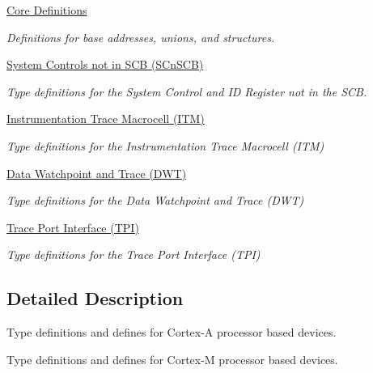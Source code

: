 \begin{DoxyCompactItemize}
\hyperlink{group___c_m_s_i_s__core__base}{Core Definitions}
\begin{DoxyCompactList}\small\item\em Definitions for base addresses, unions, and structures. \end{DoxyCompactList}\item 
\hyperlink{group___c_m_s_i_s___s_cn_s_c_b}{System Controls not in S\+C\+B (\+S\+Cn\+S\+C\+B)}
\begin{DoxyCompactList}\small\item\em Type definitions for the System Control and ID Register not in the S\+CB. \end{DoxyCompactList}\item 
\hyperlink{group___c_m_s_i_s___i_t_m}{Instrumentation Trace Macrocell (\+I\+T\+M)}
\begin{DoxyCompactList}\small\item\em Type definitions for the Instrumentation Trace Macrocell (I\+TM) \end{DoxyCompactList}\item 
\hyperlink{group___c_m_s_i_s___d_w_t}{Data Watchpoint and Trace (\+D\+W\+T)}
\begin{DoxyCompactList}\small\item\em Type definitions for the Data Watchpoint and Trace (D\+WT) \end{DoxyCompactList}\item 
\hyperlink{group___c_m_s_i_s___t_p_i}{Trace Port Interface (\+T\+P\+I)}
\begin{DoxyCompactList}\small\item\em Type definitions for the Trace Port Interface (T\+PI) \end{DoxyCompactList}\end{DoxyCompactItemize}


\subsection{Detailed Description}
Type definitions and defines for Cortex-\/A processor based devices. 

Type definitions and defines for Cortex-\/M processor based devices.